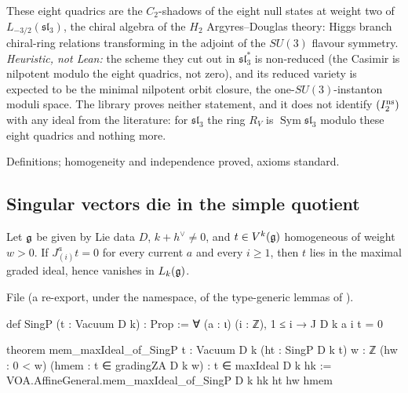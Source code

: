 \begin{physics}
These eight quadrics are the $C_2$-shadows of the eight null states at weight two of $L_{-3/2}(\mathfrak{sl}_3)$,
the chiral algebra of the $H_2$ Argyres--Douglas theory: Higgs branch chiral-ring relations transforming in
the adjoint of the $SU(3)$ flavour symmetry. \emph{Heuristic, not Lean:} the scheme they cut out in
$\mathfrak{sl}_3^*$ is non-reduced (the Casimir is nilpotent modulo the eight quadrics, not zero), and its reduced
variety is expected to be the minimal nilpotent orbit closure, the one-$SU(3)$-instanton moduli space. The library
proves neither statement, and it does not identify $(I_2^{\mathrm{ns}})$ with any ideal from the literature: for
$\mathfrak{sl}_3$ the ring $R_V$ is $\operatorname{Sym}\mathfrak{sl}_3$ modulo these eight quadrics and nothing more.
\end{physics}

\begin{status}
Definitions; homogeneity and independence proved, axioms standard.
\end{status}

\subsection{Singular vectors die in the simple quotient}

\begin{theorem}\label{l24:thm:singp}
Let $\mathfrak g$ be given by Lie data $D$, $k+h^\vee\neq0$, and $t\in V^k(\mathfrak g)$ homogeneous of
weight $w>0$. If $J^a_{(i)}t=0$ for every current $a$ and every $i\ge1$, then $t$ lies in the maximal graded
ideal, hence vanishes in $L_k(\mathfrak g)$.
\end{theorem}
\noindent File  (a re-export, under the
 namespace, of the type-generic lemmas of ).
\begin{leancode}
def SingP (t : Vacuum D k) : Prop := ∀ (a : ι) (i : ℤ), 1 ≤ i → J D k a i t = 0

theorem mem_maxIdeal_of_SingP {t : Vacuum D k} (ht : SingP D k t)
    {w : ℤ} (hw : 0 < w) (hmem : t ∈ gradingZA D k w) : t ∈ maxIdeal D k hk :=
  VOA.AffineGeneral.mem_maxIdeal_of_SingP D k hk ht hw hmem
\end{leancode}

